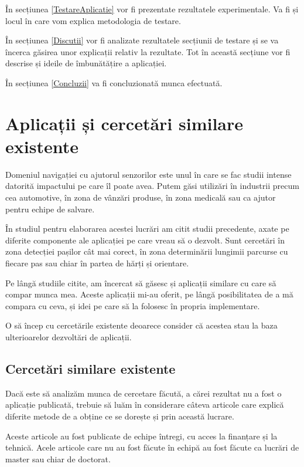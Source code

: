 \documentclass[12pt,a4paper]{article}
\begin{document}
În secțiunea \ref{TestareAplicatie} vor fi prezentate rezultatele experimentale. Va fi și locul în care vom explica metodologia de testare.

În secțiunea \ref{Discutii} vor fi analizate rezultatele secțiunii de testare și se va încerca găsirea unor explicații relativ la rezultate. Tot în această secțiune vor fi descrise și ideile de îmbunătățire a aplicației.

În secțiunea \ref{Concluzii} va fi concluzionată munca efectuată.

\newpage


\section{Aplicații și cercetări similare existente} \label{AplicatiiCercetariSimilare}
Domeniul navigației cu ajutorul senzorilor este unul în care se fac studii intense datorită impactului pe care îl poate avea. Putem găsi utilizări în industrii precum cea automotive, în zona de vânzări produse, în zona medicală sau ca ajutor pentru echipe de salvare.

În studiul pentru elaborarea acestei lucrări am citit studii precedente, axate pe diferite componente ale aplicației pe care vreau să o dezvolt. Sunt cercetări în zona detecției pașilor cât mai corect, în zona determinării lungimii parcurse cu fiecare pas sau chiar în partea de hărți și orientare.

Pe lângă studiile citite, am încercat să găsesc și aplicații similare cu care să compar munca mea. Aceste aplicații mi-au oferit, pe lângă posibilitatea de a mă compara cu ceva, și idei pe care să la folosesc în propria implementare.

O să încep cu cercetările existente deoarece consider că acestea stau la baza ulterioarelor dezvoltări de aplicații.

\subsection{Cercetări similare existente}
Dacă este să analizăm munca de cercetare făcută, a cărei rezultat nu a fost o aplicație publicată, trebuie să luăm în considerare câteva articole care explică diferite metode de a obține ce se dorește și prin această lucrare.

Aceste articole au fost publicate de echipe întregi, cu acces la finanțare și la tehnică. Acele articole care nu au fost făcute în echipă au fost făcute ca lucrări de master sau chiar de doctorat. %
\end{document}
